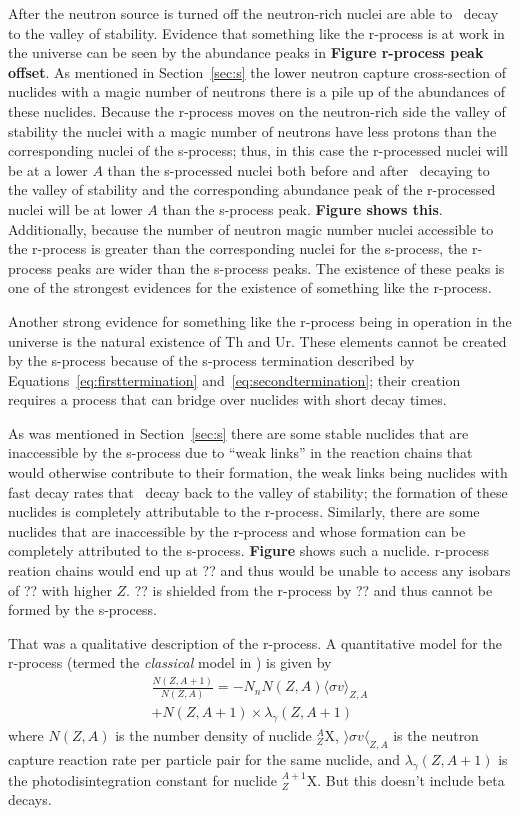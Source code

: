 After the neutron source is turned off the neutron-rich nuclei are
able to \bminus\ decay to the valley of stability.  Evidence that
something like the r-process is at work in the universe can be seen by
the abundance peaks in {\bf Figure r-process peak offset}.  As
mentioned in Section~\ref{sec:s} 
the lower neutron capture cross-section of nuclides with a magic
number of neutrons there is a pile up of the abundances of these
nuclides.   Because the r-process moves on the neutron-rich side
the valley of stability the nuclei with a magic number of neutrons
have less protons than the corresponding nuclei of the s-process;
thus, in this case the r-processed nuclei will be at a lower $A$ than the
s-processed nuclei both before and after \bminus\ decaying to the
valley of stability and the corresponding abundance peak of the
r-processed nuclei will be at lower $A$ than the s-process peak.  {\bf
Figure shows this}.  Additionally, because the number of neutron magic
number nuclei accessible to the r-process is greater than the
corresponding nuclei for the s-process, the r-process peaks are wider
than the s-process peaks.  The existence of these peaks is one of the
strongest evidences for the existence of something like the r-process.

Another strong evidence for something like the r-process being in
operation in the universe is the natural existence of Th and Ur.
These elements cannot be created by the s-process because of the
s-process termination described by Equations~\ref{eq:firsttermination}
and~\ref{eq:secondtermination}; their creation requires a process that
can bridge over nuclides with short decay times.

As was mentioned in Section~\ref{sec:s} there are some stable nuclides
that are inaccessible by the s-process due to ``weak links'' in the
reaction chains that would otherwise contribute to their formation,
the weak links being nuclides with fast decay rates that \bminus\
decay back to the valley of stability; the formation of these nuclides
is completely attributable to the r-process.  Similarly, there are
some nuclides that are inaccessible by the r-process and whose
formation can be completely attributed to the s-process.  {\bf Figure}
shows such a nuclide.  r-process reation chains would end up at ?? and
thus would be unable to access any isobars of ?? with higher $Z$.  ??
is shielded from the r-process by ?? and thus cannot be formed by the
s-process.

That was a qualitative description of the r-process.  A quantitative
model for the r-process (termed the {\it classical} model
in \citealt{iliadis2008}) is given by
\begin{multline}
\frac{N(Z,A+1)}{N(Z,A)} = - N_nN(Z,A) \langle \sigma v \rangle_{Z,A} \\
+N(Z,A+1)\times\lambda_\gamma (Z,A+1)
\end{multline}
where $N(Z,A)$ is the number density of  nuclide $^A_Z$X, $\rangle 
\sigma v \langle_{Z,A}$ is the neutron
capture reaction rate per particle pair for the same nuclide, and
$\lambda_\gamma (Z,A+1)$ is the photodisintegration constant for
nuclide  $^{A+1}_{Z}$X.  But this doesn't include beta decays.

